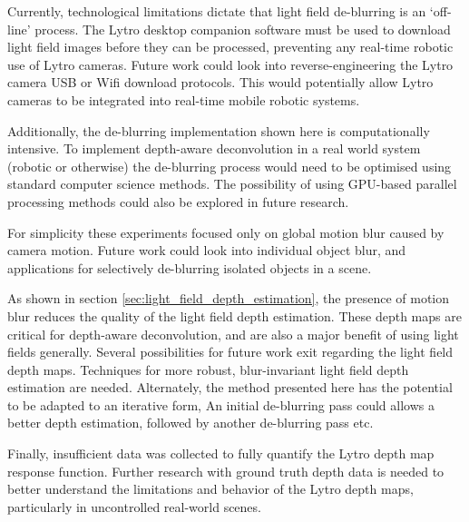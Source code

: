 Currently, technological limitations dictate that light field de-blurring is an \enquote*{off-line} process.
The Lytro desktop companion software must be used to download light field images before they can be processed, preventing any real-time robotic use of Lytro cameras.
Future work could look into reverse-engineering the Lytro camera USB or Wifi download protocols.
This would potentially allow Lytro cameras to be integrated into real-time mobile robotic systems.

Additionally, the de-blurring implementation shown here is computationally intensive.
To implement depth-aware deconvolution in a real world system (robotic or otherwise) the de-blurring process would need to be optimised using standard computer science methods.
The possibility of using GPU-based parallel processing methods could also be explored in future research.

For simplicity these experiments focused only on global motion blur caused by camera motion.
Future work could look into individual object blur, and applications for selectively de-blurring isolated objects in a scene.

As shown in section \ref{sec:light_field_depth_estimation}, the presence of motion blur reduces the quality of the light field depth estimation.
These depth maps are critical for depth-aware deconvolution, and are also a major benefit of using light fields generally.
Several possibilities for future work exit regarding the light field depth maps.
Techniques for more robust, blur-invariant light field depth estimation are needed.
Alternately, the method presented here has the potential to be adapted to an iterative form,
An initial de-blurring pass could allows a better depth estimation, followed by another de-blurring pass etc.

Finally, insufficient data was collected to fully quantify the Lytro depth map response function.
Further research with ground truth depth data is needed to better understand the limitations and behavior of the Lytro depth maps, particularly in uncontrolled real-world scenes.


